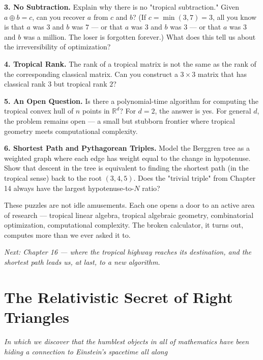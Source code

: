 \documentclass[11pt,openright,twoside]{book}
\theoremstyle{definition}
\begin{document}
\textbf{3. No Subtraction.} Explain why there is no "tropical subtraction." Given $a \oplus b = c$, can you recover $a$ from $c$ and $b$? (If $c = \min(3, 7) = 3$, all you know is that $a$ was $3$ and $b$ was $7$ --- or that $a$ was $3$ and $b$ was $3$ --- or that $a$ was $3$ and $b$ was a million. The loser is forgotten forever.) What does this tell us about the irreversibility of optimization?

\textbf{4. Tropical Rank.} The rank of a tropical matrix is not the same as the rank of the corresponding classical matrix. Can you construct a $3 \times 3$ matrix that has classical rank $3$ but tropical rank $2$?

\textbf{5. An Open Question.} Is there a polynomial-time algorithm for computing the tropical convex hull of $n$ points in $\mathbb{R}^d$? For $d = 2$, the answer is yes. For general $d$, the problem remains open --- a small but stubborn frontier where tropical geometry meets computational complexity.

\textbf{6. Shortest Path and Pythagorean Triples.} Model the Berggren tree as a weighted graph where each edge has weight equal to the change in hypotenuse. Show that descent in the tree is equivalent to finding the shortest path (in the tropical sense) back to the root $(3, 4, 5)$. Does the "trivial triple" from Chapter 14 always have the largest hypotenuse-to-$N$ ratio?

These puzzles are not idle amusements. Each one opens a door to an active area of research --- tropical linear algebra, tropical algebraic geometry, combinatorial optimization, computational complexity. The broken calculator, it turns out, computes more than we ever asked it to.


\bigskip


\textit{Next: Chapter 16 --- where the tropical highway reaches its destination, and the shortest path leads us, at last, to a new algorithm.}

\clearpage


\chapter{The Relativistic Secret of Right Triangles}
\label{ch:16}

\begin{center}
\textit{In which we discover that the humblest objects in all of mathematics have been hiding a connection to Einstein's spacetime all along}
\end{center}
\bigskip
\end{document}
